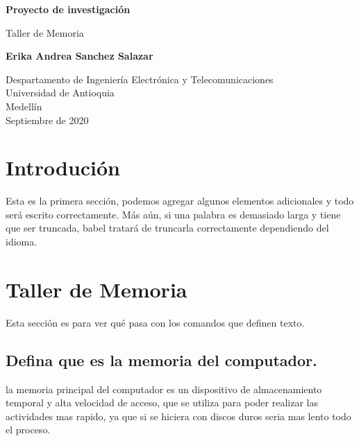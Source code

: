 \documentclass{article}
\begin{document}
\begin{titlepage}
    \begin{center}
        \vspace*{1cm}
            
        \Huge
        \textbf{Proyecto de investigación}
            
        \vspace{1.5cm}
        \LARGE
        Taller de Memoria
            
        \vspace{1.5cm}
            
        \textbf{Erika Andrea Sanchez Salazar}
            
        \vfill
            
        \vspace{0.8cm}
            
        \Large
        Despartamento de Ingeniería Electrónica y Telecomunicaciones\\
        Universidad de Antioquia\\
        Medellín\\
        Septiembre de 2020
            
    \end{center}
\end{titlepage}

\tableofcontents
\newpage
\section{Introdución}\label{intro}
Esta es la primera sección, podemos agregar algunos elementos adicionales y todo será escrito correctamente. Más aún, si una palabra es demasiado larga y tiene que ser truncada, babel tratará de truncarla correctamente dependiendo del idioma.

\section{Taller de Memoria} \label{contenido}
Esta sección es para ver qué pasa con los comandos que definen texto.
\subsection{Defina que es la memoria del computador.}
la memoria principal del computador es un dispositivo de almacenamiento temporal y alta velocidad de acceso, que se utiliza para poder realizar las actividades mas rapido, ya que si se hiciera con discos duros seria mas lento todo el proceso.
\end{document}
